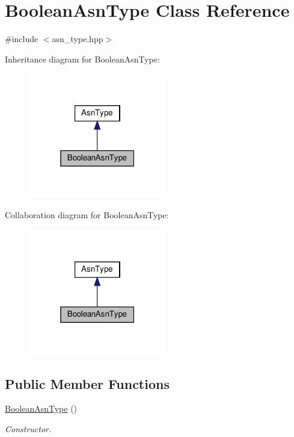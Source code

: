 \hypertarget{classBooleanAsnType}{}\section{Boolean\+Asn\+Type Class Reference}
\label{classBooleanAsnType}


{\ttfamily \#include $<$asn\+\_\+type.\+hpp$>$}



Inheritance diagram for Boolean\+Asn\+Type\+:
\nopagebreak
\begin{figure}[H]
\begin{center}
\leavevmode
\includegraphics[width=171pt]{d3/d01/classBooleanAsnType__inherit__graph}
\end{center}
\end{figure}


Collaboration diagram for Boolean\+Asn\+Type\+:
\nopagebreak
\begin{figure}[H]
\begin{center}
\leavevmode
\includegraphics[width=171pt]{d3/d3e/classBooleanAsnType__coll__graph}
\end{center}
\end{figure}
\subsection*{Public Member Functions}
\begin{DoxyCompactItemize}
\item 
\hyperlink{classBooleanAsnType_af7d54c0e8084031a730aa709d3cf9185}{Boolean\+Asn\+Type} ()
\begin{DoxyCompactList}\small\item\em Constructor. \end{DoxyCompactList}\end{DoxyCompactItemize}
